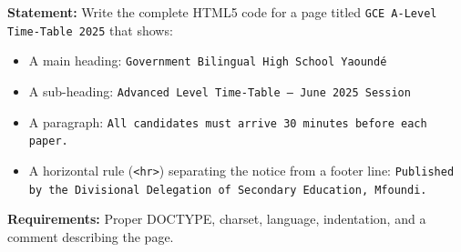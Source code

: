 \documentclass[11pt]{article}
\begin{document}
\begin{exoresolu}
\textbf{Statement:} Write the complete HTML5 code for a page titled \texttt{GCE A-Level Time-Table 2025} that shows:
\begin{itemize}
\item A main heading: \texttt{Government Bilingual High School Yaoundé}
\item A sub-heading: \texttt{Advanced Level Time-Table --- June 2025 Session}
\item A paragraph: \texttt{All candidates must arrive 30 minutes before each paper.}
\item A horizontal rule (\texttt{<hr>}) separating the notice from a footer line: \texttt{Published by the Divisional Delegation of Secondary Education, Mfoundi.}
\end{itemize}
\textbf{Requirements:} Proper DOCTYPE, charset, language, indentation, and a comment describing the page.


\end{exoresolu}
\end{document}
